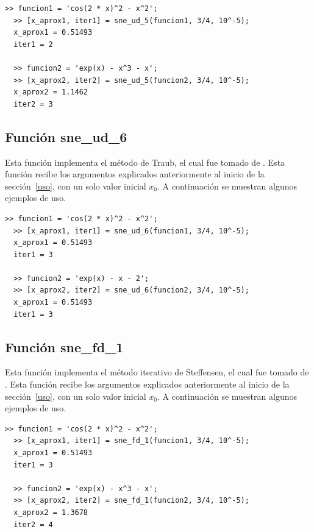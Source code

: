 \documentclass[12pt]{article}
\begin{document}
\begin{minipage}{\linewidth}
\begin{lstlisting}[frame = single]
  >> funcion1 = 'cos(2 * x)^2 - x^2';
  >> [x_aprox1, iter1] = sne_ud_5(funcion1, 3/4, 10^-5);
  x_aprox1 = 0.51493
  iter1 = 2

  >> funcion2 = 'exp(x) - x^3 - x';
  >> [x_aprox2, iter2] = sne_ud_5(funcion2, 3/4, 10^-5);
  x_aprox2 = 1.1462
  iter2 = 3

\end{lstlisting}
\end{minipage}

\subsection{Función sne\_ud\_6}
Esta función implementa el método de Traub, el cual fue tomado de \cite{budzko2015new}. Esta función recibe los argumentos explicados anteriormente al inicio de la sección~\ref{uso}, con un solo valor inicial $x_{0}$. A continuación se muestran algunos ejemplos de uso.

\begin{minipage}{\linewidth}
\begin{lstlisting}[frame = single]
  >> funcion1 = 'cos(2 * x)^2 - x^2';
  >> [x_aprox1, iter1] = sne_ud_6(funcion1, 3/4, 10^-5);
  x_aprox1 = 0.51493
  iter1 = 3

  >> funcion2 = 'exp(x) - x - 2';
  >> [x_aprox2, iter2] = sne_ud_6(funcion2, 3/4, 10^-5);
  x_aprox1 = 0.51493
  iter1 = 3

\end{lstlisting}
\end{minipage}

\subsection{Función sne\_fd\_1}
Esta función implementa el método iterativo de Steffensen, el cual fue tomado de \cite{cordero2011class}. Esta función recibe los argumentos explicados anteriormente al inicio de la sección~\ref{uso}, con un solo valor inicial $x_{0}$. A continuación se muestran algunos ejemplos de uso.

\begin{minipage}{\linewidth}
\begin{lstlisting}[frame = single]
  >> funcion1 = 'cos(2 * x)^2 - x^2';
  >> [x_aprox1, iter1] = sne_fd_1(funcion1, 3/4, 10^-5);
  x_aprox1 = 0.51493
  iter1 = 3

  >> funcion2 = 'exp(x) - x^3 - x';
  >> [x_aprox2, iter2] = sne_fd_1(funcion2, 3/4, 10^-5);
  x_aprox2 = 1.3678
  iter2 = 4

\end{lstlisting}
\end{minipage}
\end{document}
